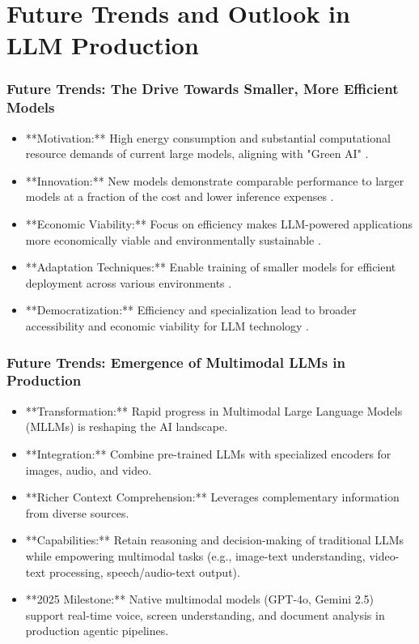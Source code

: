 \documentclass{beamer}       %
\begin{document}
\section{Future Trends and Outlook in LLM Production}

\begin{frame}
    \frametitle{Future Trends: The Drive Towards Smaller, More Efficient Models}
    \begin{itemize}
        \item **Motivation:** High energy consumption and substantial computational resource demands of current large models, aligning with "Green AI" .
        \item **Innovation:** New models demonstrate comparable performance to larger models at a fraction of the cost and lower inference expenses .
        \item **Economic Viability:** Focus on efficiency makes LLM-powered applications more economically viable and environmentally sustainable .
        \item **Adaptation Techniques:** Enable training of smaller models for efficient deployment across various environments .
        \item **Democratization:** Efficiency and specialization lead to broader accessibility and economic viability for LLM technology .
    \end{itemize}
\end{frame}

\begin{frame}
    \frametitle{Future Trends: Emergence of Multimodal LLMs in Production}
    \begin{itemize}
        \item **Transformation:** Rapid progress in Multimodal Large Language Models (MLLMs) is reshaping the AI landscape.
        \item **Integration:** Combine pre-trained LLMs with specialized encoders for images, audio, and video.
        \item **Richer Context Comprehension:** Leverages complementary information from diverse sources.
        \item **Capabilities:** Retain reasoning and decision-making of traditional LLMs while empowering multimodal tasks (e.g., image-text understanding, video-text processing, speech/audio-text output).
        \item **2025 Milestone:** Native multimodal models (GPT-4o, Gemini 2.5) support real-time voice, screen understanding, and document analysis in production agentic pipelines.
    \end{itemize}
\end{frame}
\end{document}
